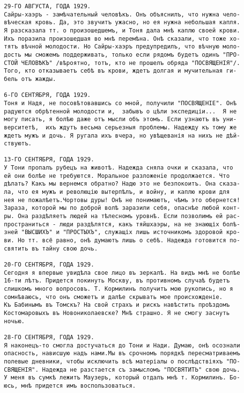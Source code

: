 \documentclass[a4paper,10pt,fleqn]{book}\usepackage{polyglossia}\setdefaultlanguage{english}\setotherlanguage{russian}\defaultfontfeatures{Ligatures=TeX,Mapping=tex-text} \usepackage{xcolor}\definecolor{lightgray}{HTML}{bbbbbb}\color{lightgray}\newcommand{\ml}[3]{\textcolor{black}{#3}}
\begin{document}
\begin{verbatim}
29-ГО АВГУСТА, ГОДА 1929.
Сайры-хаэръ - замѣчательный человѣкъ. Онъ объяснилъ, что нужна чело-
вѣческая кровь. Да, это звучитъ ужасно, но ея нужна небольшая капля.
Я разсказала тт. о произошедшемъ, и Тоня дала мнѣ каплю своей крови.
Ихъ поразила произошедшая во мнѣ перемѣна. Онѣ сказали, что тоже хо-
тятъ вѣчной молодости. Но Сайры-хаэръ предупредилъ, что вѣчную моло-
дость мы сможемъ поддерживать, только если рядомъ будетъ одинъ "ПРО-
СТОЙ ЧЕЛОВѢКЪ" /вѣроятно, тотъ, кто не прошелъ обряда "ПОСВЯЩЕНІЯ"/.
Того, кто отказываетъ себѣ въ крови, ждетъ долгая и мучительная ги-
бель отъ жажды.

6-ГО СЕНТЯБРЯ, ГОДА 1929.
Тоня и Надя, не посовѣтовавшись со мной, получили "ПОСВЯЩЕНІЕ". Онѣ
радуются обрѣтенной молодости и,  забывъ о цѣли экспедиціи...  Я не
могу писать, я болѣю даже отъ мысли объ этомъ. Если узнаютъ въ уни-
верситетѣ,  ихъ ждутъ весьма серьезныя проблемы. Надежду къ тому же
ждетъ мужъ и дочь. Я ругала ихъ вчера, но увѣщеванія на нихъ не дѣй-
ствуютъ.

13-ГО СЕНТЯБРЯ, ГОДА 1929.
У Тони пропалъ рубецъ на животѣ. Надежда сняла очки и сказала, что
ей они болѣе не требуются. Моральное разложенiе продолжается. Что
дѣлать? Какъ мы вернемся обратно? Надю это не безпокоитъ. Она сказа-
ла, что ея мужъ и революцію вытерпѣлъ, и войну, и каплю крови для
нея не пожалѣетъ.Чортовы дуры! Онѣ не понимаютъ, чѣмъ это обернется!
Зараза, которой мы по доброй волѣ заразили себя, опаснѣе любой конт-
ры. Она раздѣляетъ людей на тѣлесномъ уровнѣ. Если позволимъ ей рас-
пространиться - люди раздѣлятся, какъ тяйшхаэры, на не знающіх болѣ-
зней "ВЫСШИХЪ" и "ПРОСТЫХЪ", служащіх лишь источникомъ здоровой кро-
ви. Но тт. всё равно, онѣ думаютъ лишь о себѣ. Надежда готовится по-
святить въ тайну свою дочь.

20-ГО СЕНТЯБРЯ, ГОДА 1929.
Сегодня я впервые увидѣла свое лицо въ зеркалѣ. На видъ мнѣ не болѣе
16-ти лѣтъ. Придется покинуть Москву, въ противномъ случаѣ будетъ
слишкомъ много вопросовъ. Т. Кормилинъ получитъ мою рукопись, но я
сомнѣваюсь, что онъ сможетъ и далѣе скрывать мое происхожденіе.
Къ Бабинымъ въ Томскъ? На свой страхъ и рискъ навѣстить проѣздомъ
Костомаровыхъ въ Новониколаевске? Мнѣ страшно. Я не смогу заснуть
ночью.

28-ГО СЕНТЯБРЯ, ГОДА 1929.
Я наконецъ-то смогла достучаться до Тони и Нади. Думаю, онѣ осознали
опасность, нависшую надъ нами.Мы въ срочномъ порядкѣ пересматриваемъ
полевые дневники, чтобы исключить всѣ матеріалы о послѣдствіяхъ "ПО-
СВЯЩЕНІЯ". Надежда не разстается съ замысломъ "ПОСВЯТИТЬ" свою дочь.
У меня въ сумкѣ лежитъ Маузеръ, который отдалъ мнѣ т. Кормилинъ. Бо-
юсь, мнѣ придется имъ воспользоваться.
\end{verbatim}
\end{document}
